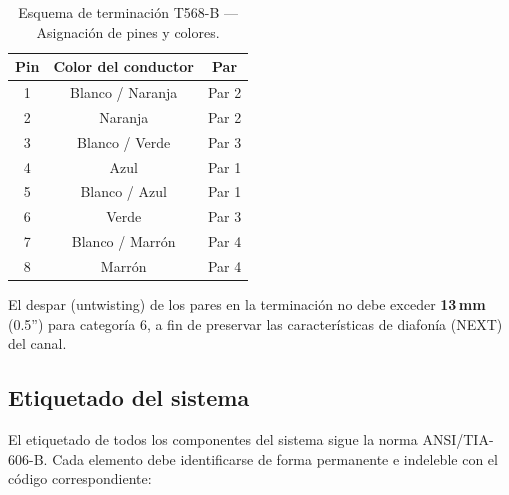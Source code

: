\begin{table}[H]
    \centering
    \caption{Esquema de terminación T568-B — Asignación de pines y colores.}
    \label{tab:t568b}
    \begin{tabular}{|c|c|c|}
        \hline
        \textbf{Pin} & \textbf{Color del conductor} & \textbf{Par} \\
        \hline
        1 & Blanco / Naranja  & Par 2 \\
        2 & Naranja           & Par 2 \\
        3 & Blanco / Verde    & Par 3 \\
        4 & Azul              & Par 1 \\
        5 & Blanco / Azul     & Par 1 \\
        6 & Verde             & Par 3 \\
        7 & Blanco / Marrón   & Par 4 \\
        8 & Marrón            & Par 4 \\
        \hline
    \end{tabular}
\end{table}%
\nobreak\vspace{-0.3cm}
El despar (untwisting) de los pares en la terminación no debe exceder
\textbf{13\,mm} (0.5'') para categoría 6, a fin de preservar las
características de diafonía (NEXT) del canal.

\subsection{Etiquetado del sistema}

El etiquetado de todos los componentes del sistema sigue la norma
\mbox{ANSI/TIA-606-B}. Cada elemento debe identificarse de forma permanente
e indeleble con el código correspondiente:

